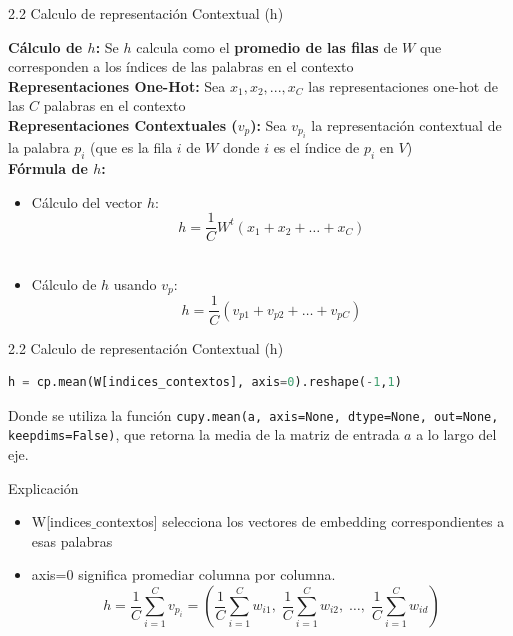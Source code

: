 \documentclass{beamer}
\begin{document}
\begin{frame}[fragile]{2.2 Calculo de representación Contextual (h)}

		\justifying
		\textbf{Cálculo de $h$:} Se $h$ calcula como el \textbf{promedio de las filas} de $W$ que corresponden a los índices de las palabras en el contexto\\
		\vspace{0.1cm}
		\textbf{Representaciones One-Hot:}  Sea $x_1, x_2, ..., x_C$ las representaciones one-hot de las $C$ palabras en el contexto\\
		\vspace{0.1cm}
		\textbf{Representaciones Contextuales ($v_p$):} Sea $v_{p_i}$ la representación contextual de la palabra $p_i$ (que es la fila $i$ de $W$ donde $i$ es el índice de $p_i$ en $V$) \\
		\vspace{0.1cm}
		\textbf{Fórmula de $h$:} 						\\
		\begin{itemize}
			\item Cálculo del vector $h$: 	
			$$h = \frac{1}{C} W^t(x_1 + x_2 + \dots + x_C)$$\\
			\item Cálculo de $h$ usando $v_p$:
			 $$h = \frac{1}{C} (v_{p1} + v_{p2} + \dots + v_{pC})$$
		\end{itemize}
\end{frame}

	
\begin{frame}[fragile]{2.2 Calculo de representación Contextual (h)}

	\begin{lstlisting}[language=Python]
		h = cp.mean(W[indices_contextos], axis=0).reshape(-1,1)
	\end{lstlisting}
	Donde se utiliza la función \texttt{cupy.mean(a, axis=None, dtype=None, out=None, keepdims=False)}, que retorna la media de la matriz de entrada $a$ a lo largo del eje. 
	
	\begin{block}{Explicación}
	\begin{itemize}
	\item W[indices$\_$contextos] selecciona los vectores de embedding correspondientes a esas palabras\\
	\item axis=0 significa promediar columna por columna.
	\[
	h = \frac{1}{C} \sum_{i=1}^{C} v_{p_i}
	= \left(
	\frac{1}{C}\sum_{i=1}^C w_{i1}, \;
	\frac{1}{C}\sum_{i=1}^C w_{i2}, \;
	\dots, \;
	\frac{1}{C}\sum_{i=1}^C w_{id}
	\right)
	\]
\end{itemize}
	\end{block}
\end{frame}
\end{document}
